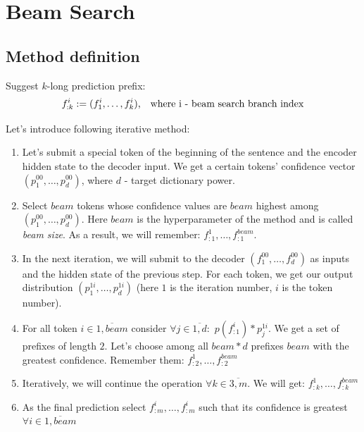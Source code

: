 \documentclass[a4paper,14pt]{extarticle}
\begin{document}
	\section{Beam Search}
	\subsection{Method definition}
	Suggest $k$-long prediction prefix:
	\begin{equation}
		f_{:k}^{i} := (f_1^{i}, \dots, f_k^{i}) \text{, \,\, where i - beam search branch index}
	\end{equation}
	
	Let's introduce following iterative method:
	
	\begin{enumerate}
		\item Let's submit a special token of the beginning of the sentence and the encoder hidden state to the decoder input. We get a certain tokens' confidence vector $(p_1^{00}, \dots, p_d^{00})$, where $d$ - target dictionary power.
		
		\item Select $beam$ tokens whose confidence values are $beam$ highest among $ (p_1^{00}, \dots, p_d^{00})$. Here $beam$ is the hyperparameter of the method and is called \textit{beam size}. As a result, we will remember: $f_{:1}^1, \dots, f_{:1}^{beam}$. 
		
		\item In the next iteration, we will submit to the decoder $(f_1^{00}, \dots, f_d^{00})$ as inputs and the hidden state of the previous step. For each token, we get our output distribution $(p_1^{1i}, \dots, p_d^{1i})$ (here $1$ is the iteration number, $i$ is the token number).
		\item For all token $i \in \overline{1, beam}$ consider $\forall j \in \overline{1, d}: \,\, p(f_{:1}^i) * p_j^{1i}$. We get a set of prefixes of length $2$. Let's choose among all $beam * d$ prefixes $beam$ with the greatest confidence. Remember them: $f_{:2}^1, \dots, f_{:2}^{beam}$
		
		\item Iteratively, we will continue the operation $\forall k \in \overline{3, m}$. We will get: $f_ {: k}^1, \dots, f_{:k}^{beam}$
		
		\item As the final prediction select $f_{:m}^i, \dots, f_{:m}^i$ such that its confidence is greatest $\forall i \in \overline{1, beam}$
	\end{enumerate}
	
\end{document}
